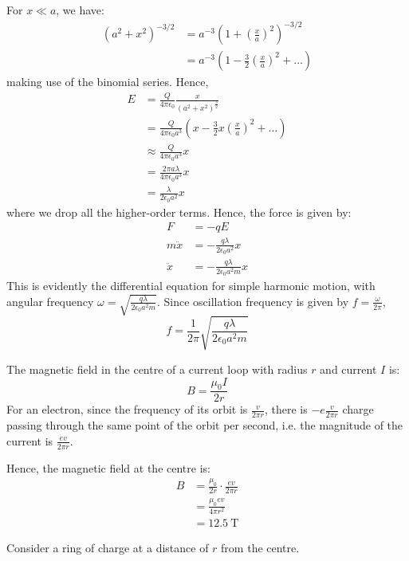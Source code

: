 \begin{solution}
    \begin{subsolution}
        For $x\ll a$, we have:
        \begin{align*}
            \left(a^2+x^2\right)^{-3/2}&=a^{-3}\left(1+\left(\frac{x}{a}\right)^2\right)^{-3/2}\\
            &=a^{-3}\left(1-\frac{3}{2}\left(\frac{x}{a}\right)^2+\dots\right)
        \end{align*}
        making use of the binomial series. Hence,
        \begin{align*}
            E&=\frac{Q}{4 \pi \epsilon_0}\frac{x}{\left(a^{2}+x^{2}\right)^{\frac{3}{2}}}\\
            &=\frac{Q}{4 \pi \epsilon_0 a^3}\left(x-\frac{3}{2}x\left(\frac{x}{a}\right)^2+\dots\right)\\
            &\approx \frac{Q}{4 \pi \epsilon_0 a^3}x\\
            &=\frac{2\pi a \lambda}{4 \pi \epsilon_0 a^3}x\\
            &=\frac{\lambda}{2\epsilon_0 a^2}x
        \end{align*}
        where we drop all the higher-order terms. Hence, the force is given by:
        \begin{align*}
            F&=-qE\\
            m\ddot{x}&=-\frac{q\lambda}{2\epsilon_0 a^2}x\\
            \ddot{x}&=-\frac{q\lambda}{2\epsilon_0 a^2m}x
        \end{align*}
        This is evidently the differential equation for simple harmonic motion, with angular frequency \(\omega=\sqrt{\frac{q\lambda}{2\epsilon_0 a^2m}}\). Since oscillation frequency is given by \(f=\frac{\omega}{2\pi}\),
        \[f=\boxed{\frac{1}{2\pi}\sqrt{\frac{q\lambda}{2\epsilon_0 a^2m}}}\]
    \end{subsolution}
    \begin{subsolution}
        The magnetic field in the centre of a current loop with radius $r$ and current $I$ is:
        \[B=\frac{\mu_0I}{2r}\]
        For an electron, since the frequency of its orbit is \(\frac{v}{2\pi r}\), there is \(-e\frac{v}{2\pi r}\) charge passing through the same point of the orbit per second, i.e. the magnitude of the current is \(\frac{ev}{2\pi r}\).

        Hence, the magnetic field at the centre is:
        \begin{align*}
            B&=\frac{\mu_0}{2r}\cdot\frac{ev}{2\pi r}\\
            &=\frac{\mu_0ev}{4\pi r^2}\\
            &=\boxed{\qty{12.5}{\tesla}}
        \end{align*}
    \end{subsolution}
    \begin{subsolution}
        Consider a ring of charge at a distance of $r$ from the centre.
        \begin{center}
            

\end{center}
\end{subsolution}
\end{solution}
